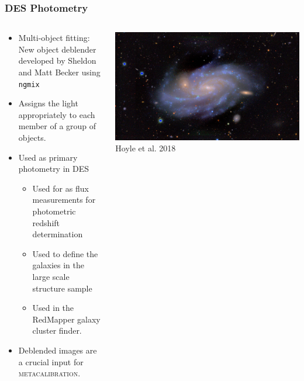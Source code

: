 \documentclass[aspectratio=169]{beamer}
\newcommand{\mcal}{\textsc{metacalibration}}
\newcommand{\ngmix}{\texttt{ngmix}}
\begin{document}
\frame
{

    \frametitle{DES Photometry}


    \begin{columns}
        \begin{column}{0.5\textwidth}
            \begin{itemize}

                \item Multi-object fitting:  New object deblender developed by
                    Sheldon and Matt Becker using \ngmix

                \item Assigns the light appropriately to each member of a group
                    of objects.

                \item Used as primary photometry in DES
                    \begin{itemize}

                        \item Used for as flux measurements for photometric
                            redshift determination

                        \item Used to define the galaxies in
                            the large scale structure sample

                        \item Used in the RedMapper galaxy cluster
                            finder.

                    \end{itemize}

                \item Deblended images are a crucial input for \mcal.

            \end{itemize}

        \end{column}
        \begin{column}{0.5\textwidth}
            \centering
                \includegraphics[width=\linewidth]{DES0130-2249-nearby-projection.jpg}
                \newline
                {\tiny Hoyle et al. 2018}
        \end{column}


\end{columns}}
\end{document}
